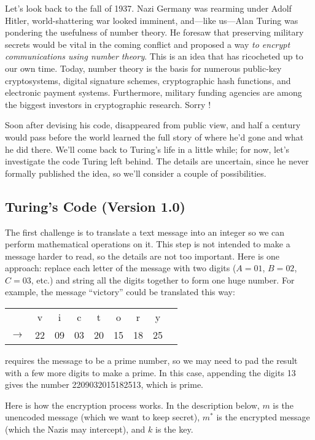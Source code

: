 Let's look back to the fall of 1937.  Nazi Germany was rearming under
Adolf Hitler, world-shattering war looked imminent, and---like
us---Alan Turing was pondering the usefulness of number theory.  He
foresaw that preserving military secrets would be vital in the coming
conflict and proposed a way \emph{to encrypt communications using
number theory}.  This is an idea that has ricocheted up to our own
time.  Today, number theory is the basis for numerous public-key
cryptosystems, digital signature schemes, cryptographic hash
functions, and electronic payment systems.  Furthermore, military
funding agencies are among the biggest investors in cryptographic
research.  Sorry !

Soon after devising his code,  disappeared from public view,
and half a century would pass before the world learned the full story of
where he'd gone and what he did there.  We'll come back to Turing's life
in a little while; for now, let's investigate the code Turing left behind.
The details are uncertain, since he never formally published the idea, so
we'll consider a couple of possibilities.

\subsection{Turing's Code (Version 1.0)}

The first challenge is to translate a text message into an integer so
we can perform mathematical operations on it.  This step is not
intended to make a message harder to read, so the details are not too
important.  Here is one approach: replace each letter of the message
with two digits ($A = 01$, $B = 02$, $C = 03$, etc.) and string all
the digits together to form one huge number.  For example, the message
``victory'' could be translated this way:
%
\begin{center}
\begin{tabular}{ccccccccc}
   &v &  i &  c &  t & o & r & y \\
$\rightarrow$ & 22 & 09 & 03 & 20 & 15 & 18 & 25
\end{tabular}
\end{center}
%
 requires the message to be a prime number, so we may
need to pad the result with a few more digits to make a prime.  In
this case, appending the digits 13 gives the number 2209032015182513,
which is prime.

Here is how the encryption process works.  In the description
below, $m$ is the unencoded message (which we want to keep secret),
$m^*$ is the encrypted message (which the Nazis may intercept), and
$k$ is the key.

